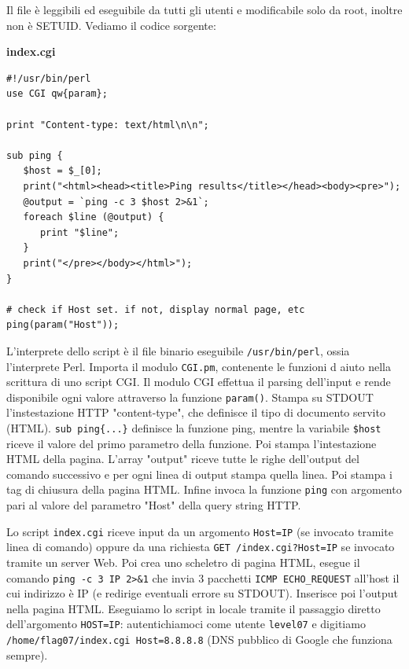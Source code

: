 Il file è leggibili ed eseguibile da tutti gli utenti e modificabile solo da root, inoltre non è SETUID. Vediamo il codice sorgente:

\begin{mdframed}[backgroundcolor=white!20,shadow=false]
\textbf{index.cgi}
\begin{verbatim}
#!/usr/bin/perl
use CGI qw{param};

print "Content-type: text/html\n\n";

sub ping {
   $host = $_[0];
   print("<html><head><title>Ping results</title></head><body><pre>");
   @output = `ping -c 3 $host 2>&1`;
   foreach $line (@output) { 
      print "$line"; 
   }
   print("</pre></body></html>");
}

# check if Host set. if not, display normal page, etc
ping(param("Host"));
\end{verbatim}
\end{mdframed}

L'interprete dello script è il file binario eseguibile \texttt{/usr/bin/perl}, ossia l'interprete Perl. Importa il modulo \texttt{CGI.pm}, contenente le funzioni d aiuto nella scrittura di uno script CGI. Il modulo CGI effettua il parsing dell'input e rende disponibile ogni valore attraverso la funzione \texttt{param()}. Stampa su STDOUT l'instestazione HTTP "content-type", che definisce il tipo di documento servito (HTML). \texttt{sub ping\{...\}} definisce la funzione ping, mentre la variabile \texttt{\$host} riceve il valore del primo parametro della funzione. Poi stampa l'intestazione HTML della pagina. L'array "output" riceve tutte le righe dell'output del comando successivo e per ogni linea di output stampa quella linea. Poi stampa i tag di chiusura della pagina HTML. Infine invoca la funzione \texttt{ping} con argomento pari al valore del parametro "Host" della query string HTTP. 

Lo script \texttt{index.cgi} riceve input da un argomento \texttt{Host=IP} (se invocato tramite linea di comando) oppure da una richiesta \texttt{GET /index.cgi?Host=IP} se invocato tramite un server Web. Poi crea uno scheletro di pagina HTML, esegue il comando \texttt{ping -c 3 IP 2>\&1} che invia 3 pacchetti \texttt{ICMP ECHO\_REQUEST} all'host il cui indirizzo è IP (e redirige eventuali errore su STDOUT). Inserisce poi l'output nella pagina HTML. Eseguiamo lo script in locale tramite il passaggio diretto dell'argomento \texttt{HOST=IP}: autentichiamoci come utente \texttt{level07} e digitiamo \texttt{/home/flag07/index.cgi Host=8.8.8.8} (DNS pubblico di Google che funziona sempre).

